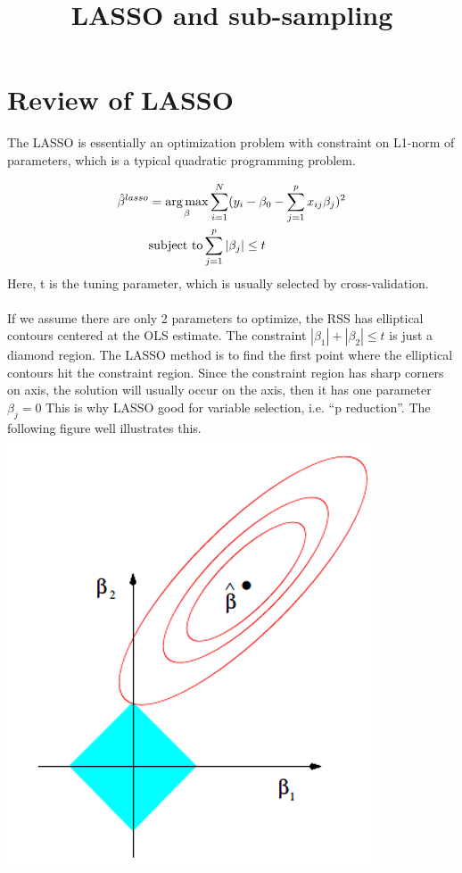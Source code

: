 \documentclass[]{article}
\title{LASSO and sub-sampling}
\begin{document}
\maketitle

\section{Review of LASSO}
The LASSO is essentially an optimization problem with constraint on L1-norm of parameters, which is a typical quadratic programming problem.


\begin{align}
	\hat{\beta}^{lasso} & = \underset{\beta}{\arg\max} \sum_{i=1}^{N}(y_i-\beta_0-\sum_{j=1}^{p}x_{ij}\beta_j)^2\\
	&\text{subject to}
	\sum_{j=1}^{p}|\beta_j|\leq t \notag
\end{align}
Here, t is the tuning parameter, which is usually selected by cross-validation.\\
\\
If we assume there are only 2 parameters to optimize, the RSS has elliptical contours centered at the OLS estimate. The constraint $|\beta_1|+|\beta_2| \leq t$ is just a diamond region. The LASSO method is to find the first point where the elliptical contours hit the constraint region. Since the constraint region has sharp corners on axis, the solution will usually occur on the axis, then it has one parameter $\beta_j = 0$ This is why LASSO good for variable selection, i.e. “p reduction”. The following figure well illustrates this.\\
\includegraphics[width = .7\textwidth]{l1_select.png}\\
\end{document}
